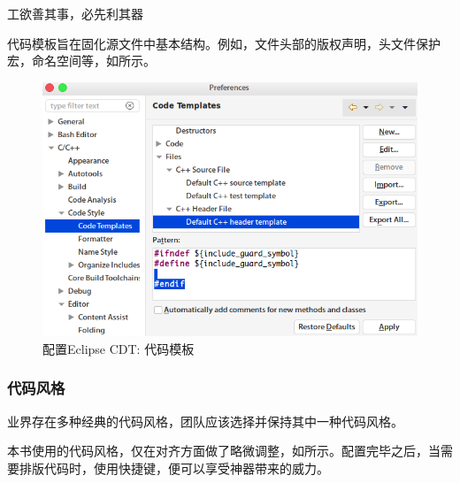 \begin{content}
\begin{episode}{工欲善其事，必先利其器}
\begin{content}
代码模板旨在固化源文件中基本结构。例如，文件头部的版权声明，头文件保护宏，命名空间等，如所示。

\begin{figure}[H]
\centering
\includegraphics[width=1.0\textwidth]{figures/xunit/eclipse-code-template.png}
\caption{配置Eclipse CDT: 代码模板}
 \label{fig:eclipse-code-template}
\end{figure}

\subsubsection{代码风格}

业界存在多种经典的代码风格，团队应该选择并保持其中一种代码风格。

\begin{enum}
\end{enum}

本书使用的代码风格，仅在对齐方面做了略微调整，如所示。配置完毕之后，当需要排版代码时，使用快捷键，便可以享受神器带来的威力。


\end{content}
\end{episode}
\end{content}
